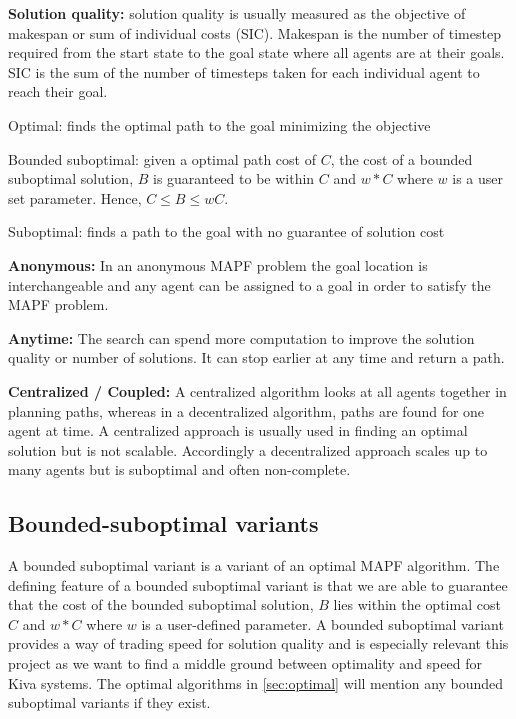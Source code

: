 \documentclass[a4paper,11pt]{article}
\begin{document}
\noindent \textbf{Solution quality:} solution quality is usually measured as the objective of makespan or sum of individual costs (SIC). Makespan is the number of timestep required from the start state to the goal state where all agents are at their goals. SIC is the sum of the number of timesteps taken for each individual agent to reach their goal.
\begin{compactitem}
	\item Optimal: finds the optimal path to the goal minimizing the objective
	\item Bounded suboptimal: given a optimal path cost of $C$, the cost of a bounded suboptimal solution, $B$ is guaranteed to be within $C$ and $w*C$ where $w$ is a user set parameter. Hence, $C \le B \le wC$.
	\item Suboptimal: finds a path to the goal with no guarantee of solution cost
\end{compactitem}

\noindent \textbf{Anonymous:} In an anonymous MAPF problem the goal location is interchangeable and any agent can be assigned to a goal in order to satisfy the MAPF problem.

\noindent \textbf{Anytime:} The search can spend more computation to improve the solution quality or number of solutions. It can stop earlier at any time and return a path.

\noindent \textbf{Centralized / Coupled:} A centralized algorithm looks at all agents together in planning paths, whereas in a decentralized algorithm, paths are found for one agent at time. A centralized approach is usually used in finding an optimal solution but is not scalable. Accordingly a decentralized approach scales up to many agents but is suboptimal and often non-complete.

\subsection{Bounded-suboptimal variants} 
A bounded suboptimal variant is a variant of an optimal MAPF algorithm. The defining feature of a bounded suboptimal variant is that we are able to guarantee that the cost of the bounded suboptimal solution, $B$ lies within the optimal cost $C$ and $w*C$ where $w$ is a user-defined parameter. A bounded suboptimal variant provides a way of trading speed for solution quality and is especially relevant this project as we want to find a middle ground between optimality and speed for Kiva systems. The optimal algorithms in \ref{sec:optimal} will mention any bounded suboptimal variants if they exist.
\end{document}
